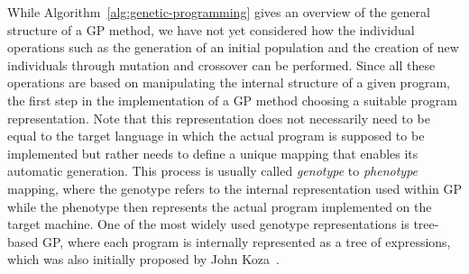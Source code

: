 While Algorithm~\ref{alg:genetic-programming} gives an overview of the general structure of a GP method, we have not yet considered how the individual operations such as the generation of an initial population and the creation of new individuals through mutation and crossover can be performed.
Since all these operations are based on manipulating the internal structure of a given program, the first step in the implementation of a GP method choosing a suitable program representation.
Note that this representation does not necessarily need to be equal to the target language in which the actual program is supposed to be implemented but rather needs to define a unique mapping that enables its automatic generation.
This process is usually called \emph{genotype} to \emph{phenotype} mapping, where the genotype refers to the internal representation used within GP while the phenotype then represents the actual program implemented on the target machine.
One of the most widely used genotype representations is tree-based GP, where each program is internally represented as a tree of expressions, which was also initially proposed by John Koza~\cite{koza1994genetic}.
